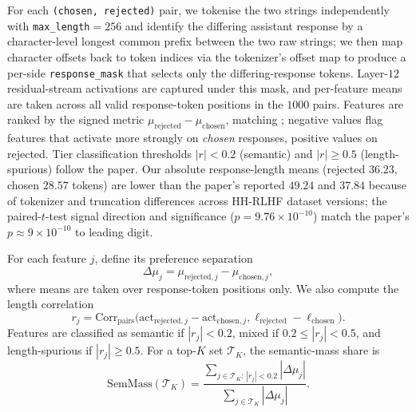 For each \texttt{(chosen, rejected)} pair, we tokenise the two strings independently with \texttt{max\_length}$=256$ and identify the differing assistant response by a character-level longest common prefix between the two raw strings; we then map character offsets back to token indices via the tokenizer's offset map to produce a per-side \texttt{response\_mask} that selects only the differing-response tokens. Layer-$12$ residual-stream activations are captured under this mask, and per-feature means are taken across all valid response-token positions in the $1000$ pairs. Features are ranked by the signed metric $\mu_{\mathrm{rejected}}-\mu_{\mathrm{chosen}}$, matching \citet[\S4.5]{bhalla2025tsae}; negative values flag features that activate more strongly on \emph{chosen} responses, positive values on rejected. Tier classification thresholds $|r|<0.2$ (semantic) and $|r|\geq 0.5$ (length-spurious) follow the paper. Our absolute response-length means (rejected $36.23$, chosen $28.57$ tokens) are lower than the paper's reported $49.24$ and $37.84$ because of tokenizer and truncation differences across HH-RLHF dataset versions; the paired-$t$-test signal direction and significance ($p=9.76\times10^{-10}$) match the paper's $p\approx 9\times10^{-10}$ to leading digit.

For each feature $j$, define its preference separation
\[
    \Delta\mu_j
    =
    \mu_{\mathrm{rejected},j}-\mu_{\mathrm{chosen},j},
\]
where means are taken over response-token positions only. We also compute the
length correlation
\[
    r_j
    =
    \mathrm{Corr}_{\text{pairs}}
    \bigl(
        \mathrm{act}_{\mathrm{rejected},j}
        -
        \mathrm{act}_{\mathrm{chosen},j},
        \ell_{\mathrm{rejected}}-\ell_{\mathrm{chosen}}
    \bigr).
\]
Features are classified as semantic if $|r_j|<0.2$, mixed if
$0.2\leq |r_j|<0.5$, and length-spurious if $|r_j|\geq0.5$. For a top-$K$
set $\mathcal T_K$, the semantic-mass share is
\[
    \mathrm{SemMass}(\mathcal T_K)
    =
    \frac{\sum_{j\in\mathcal T_K:\, |r_j|<0.2} |\Delta\mu_j|}
         {\sum_{j\in\mathcal T_K} |\Delta\mu_j|}.
\]

